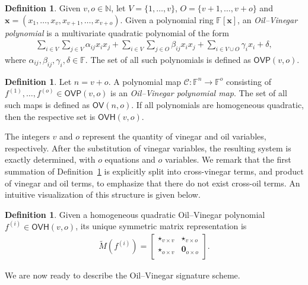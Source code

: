 \documentclass[12pt, a4paper, oneside]{memoir}
\theoremstyle{definition}
\newtheorem{definition}[theorem]{Definition}
\begin{document}
\begin{definition}\label{def:oil-vinegar-poly}
  Given $v, o \in \mathbb{N}$, let $V = \{1, \dots, v\}$, $O = \{v + 1, \dots, v + o\}$ and $\mathbf{x} = (x_{1}, \dots, x_{v}, x_{v + 1}, \dots, x_{v + o})$. Given a polynomial ring $\mathbb{F}[\mathbf{x}]$, an \emph{Oil--Vinegar polynomial} is a multivariate quadratic polynomial of the form
  \begin{align}
    \sum_{i \in V} \sum_{j \in V} \alpha_{ij} x_{i} x_{j}
      + \sum_{i \in V} \sum_{j \in O} \beta_{ij} x_{i} x_{j}
      + \sum_{i \in V \cup O} \gamma_{i} x_{i}
      + \delta,
  \end{align}
  where $\alpha_{ij}, \beta_{ij}, \gamma_{i}, \delta \in \mathbb{F}$. The set of all such polynomials is defined as $\mathsf{OVP}(v, o)$.
\end{definition}

\begin{definition}
  Let $n = v + o$. A polynomial map $\mathcal{C} : \mathbb{F}^{n} \to \mathbb{F}^{o}$ consisting of $f^{(1)}, \dots, f^{(o)} \in \mathsf{OVP}(v, o)$ is an \emph{Oil--Vinegar polynomial map}. The set of all such maps is defined as $\mathsf{OV}(n, o)$. If all polynomials are homogeneous quadratic, then the respective set is $\mathsf{OVH}(v, o)$.
\end{definition}

The integers $v$ and $o$ represent the quantity of vinegar and oil variables, respectively. After the substitution of vinegar variables, the resulting system is exactly determined, with $o$ equations and $o$ variables. We remark that the first summation of Definition~\ref{def:oil-vinegar-poly} is explicitly split into cross-vinegar terms, and product of vinegar and oil terms, to emphasize that there do not exist cross-oil terms. An intuitive visualization of this structure is given below.

\begin{definition}\label{def:ovh-matrix}
  Given a homogeneous quadratic Oil--Vinegar polynomial $f^{(i)} \in \mathsf{OVH}(v, o)$, its unique symmetric matrix representation is
  \begin{align}
    \widetilde{M}(f^{(i)}) =
    \begin{bmatrix}
      \star_{v \times v} & \star_{v \times o} \\
      \star_{o \times v} & \mathbf{0}_{o \times o} \\
    \end{bmatrix}.
  \end{align}
\end{definition}
We are now ready to describe the Oil--Vinegar signature scheme.
\end{document}
